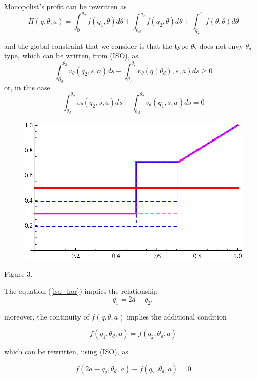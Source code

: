 \begin{itemize}
Monopolist's profit can be rewritten as 
\begin{equation}
 \Pi(q,\theta,a)=\int_{0}^{\theta_{d}} f(q_{1},\theta)d\theta + \int_{\theta_{d}}^{q_{2}} f(q_{2},\theta)d\theta + \int_{q_{2}}^{1} f(\theta,\theta)d\theta
\end{equation}

and the global constraint that  we consider is that the type $\theta_{2}$ does not envy $\theta_{d}$-type, which can be written, from (ISO), as
 $$\int_{\theta_{d}}^{\theta_{2}}  v_{\theta} (q_{2},s,a)  ds - \int_{\theta_{d}}^{\theta_{2}}  v_{\theta} (q(\theta_{d}),s,a) ds \geq 0$$
or, in this case
\begin{equation}
\label{iso_hor}
\int_{\theta_{d}}^{\theta_{2}}  v_{\theta} (q_{2},s,a)  ds - \int_{\theta_{d}}^{\theta_{2}}  v_{\theta} (q_{1},s,a) ds = 0
\end{equation}


\begin{center}
\begin{figure}[h!]
\includegraphics[scale=0.8]{iso_hor.eps} 
\end{figure}
Figure 3.
\end{center}



The equation (\ref{iso_hor}) implies the relationship $$q_{1}=2a-q_{2},$$

moreover, the continuity of $f(q,\theta,a)$ implies the additional condition 

$$f(q_{1},\theta_{d},a)=f(q_{2},\theta_{d},a)$$
 
which can be rewritten, using (ISO), as

\begin{equation}
\label{cont_hor}
 f(2a-q_{2},\theta_{d},a)-f(q_{2},\theta_{d},a)=0
\end{equation}


\end{itemize}
